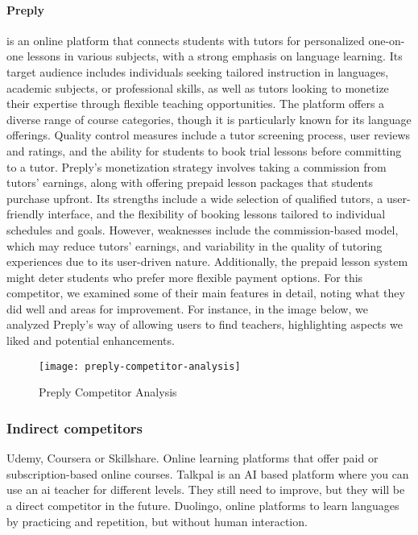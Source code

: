 \paragraph{Preply} is an online platform that connects students with tutors for personalized one-on-one lessons in various subjects, with a strong emphasis on language learning.
Its target audience includes individuals seeking tailored instruction in languages, academic subjects, or professional skills, as well as tutors looking to monetize their expertise through flexible teaching opportunities.
The platform offers a diverse range of course categories, though it is particularly known for its language offerings.
Quality control measures include a tutor screening process, user reviews and ratings, and the ability for students to book trial lessons before committing to a tutor.
Preply's monetization strategy involves taking a commission from tutors' earnings, along with offering prepaid lesson packages that students purchase upfront.
Its strengths include a wide selection of qualified tutors, a user-friendly interface, and the flexibility of booking lessons tailored to individual schedules and goals.
However, weaknesses include the commission-based model, which may reduce tutors' earnings, and variability in the quality of tutoring experiences due to its user-driven nature.
Additionally, the prepaid lesson system might deter students who prefer more flexible payment options.
For this competitor, we examined some of their main features in detail, noting what they did well and areas for improvement.
For instance, in the image below, we analyzed Preply's way of allowing users to find teachers, highlighting aspects we liked and potential enhancements.

\begin{figure}[h]
    \centering
    \texttt{[image: preply-competitor-analysis]}
    \caption{Preply Competitor Analysis}
    \label{fig:figure10}
\end{figure}
\clearpage

\subsubsection{Indirect competitors}
Udemy, Coursera or Skillshare.
Online learning platforms that offer paid or subscription-based online courses.
Talkpal is an AI based platform where you can use an ai teacher for different levels.
They still need to improve, but they will be a direct competitor in the future.
Duolingo, online platforms to learn languages by practicing and repetition, but without human interaction.

